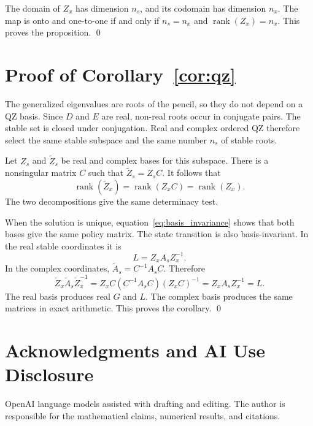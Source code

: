 \documentclass[11pt]{article}
\begin{document}
The domain of $Z_x$ has dimension $n_s$, and its codomain has dimension
$n_x$. The map is onto and one-to-one if and only if $n_s=n_x$ and
$\operatorname{rank}(Z_x)=n_x$. This proves the proposition. \qed

\section{Proof of Corollary~\ref{cor:qz}}

The generalized eigenvalues are roots of the pencil, so they do not depend on
a QZ basis. Since $D$ and $E$ are real, non-real roots occur in conjugate
pairs. The stable set is closed under conjugation. Real and complex ordered QZ
therefore select the same stable subspace and the same number $n_s$ of stable
roots.

Let $Z_s$ and $\widetilde Z_s$ be real and complex bases for this subspace.
There is a nonsingular matrix $C$ such that
$\widetilde Z_s=Z_sC$. It follows that
\[
    \operatorname{rank}(\widetilde Z_x)
    =\operatorname{rank}(Z_xC)
    =\operatorname{rank}(Z_x).
\]
The two decompositions give the same determinacy test.

When the solution is unique, equation~\eqref{eq:basis_invariance} shows that
both bases give the same policy matrix. The state transition is also
basis-invariant. In the real stable coordinates it is
\[
    L=Z_xA_sZ_x^{-1}.
\]
In the complex coordinates,
$\widetilde A_s=C^{-1}A_sC$. Therefore
\[
    \widetilde Z_x\widetilde A_s\widetilde Z_x^{-1}
    =Z_xC(C^{-1}A_sC)(Z_xC)^{-1}
    =Z_xA_sZ_x^{-1}
    =L.
\]
The real basis produces real $G$ and $L$. The complex basis produces the same
matrices in exact arithmetic. This proves the corollary. \qed

\section*{Acknowledgments and AI Use Disclosure}

OpenAI language models assisted with drafting and editing. The author is
responsible for the mathematical claims, numerical results, and citations.
\end{document}
